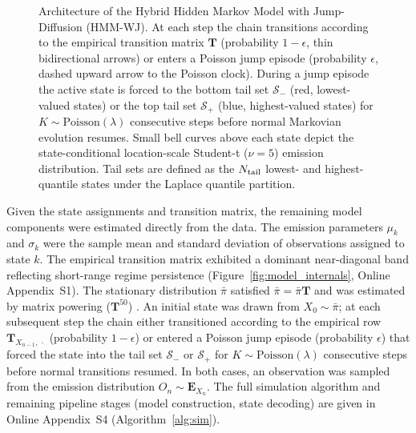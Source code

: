 \begin{figure}[tp]
{\begin{tikzpicture}
\end{tikzpicture}%
}
\caption{Architecture of the Hybrid Hidden Markov Model with Jump-Diffusion (HMM-WJ).
    At each step the chain transitions according to the empirical transition matrix $\mathbf{T}$
    (probability $1-\epsilon$, thin bidirectional arrows) or enters a Poisson jump episode
    (probability $\epsilon$, dashed upward arrow to the Poisson clock).
    During a jump episode the active state is forced to the bottom tail set $\mathcal{S}_{-}$
    (red, lowest-valued states) or the top tail set $\mathcal{S}_{+}$ (blue, highest-valued states)
    for $K\!\sim\!\mathrm{Poisson}(\lambda)$ consecutive steps before normal Markovian evolution
    resumes.  Small bell curves above each state depict the state-conditional
    location-scale Student-t ($\nu=5$) emission distribution.  Tail sets are defined as the
    $N_{\rm tail}$ lowest- and highest-quantile states under the Laplace quantile partition.}
\label{fig:model_architecture}
\end{figure}

Given the state assignments and transition matrix, the remaining model components were estimated directly from the data. The emission parameters $\mu_k$ and $\sigma_k$ were the sample mean and standard deviation of observations assigned to state $k$. The empirical transition matrix exhibited a dominant near-diagonal band reflecting short-range regime persistence (Figure~\ref{fig:model_internals}, Online Appendix~S1). The stationary distribution $\bar{\pi}$ satisfied $\bar{\pi} = \bar{\pi}\mathbf{T}$ and was estimated by matrix powering ($\mathbf{T}^{50}$) \cite{hamilton_regime_2018, grinstead_introduction_1997}. An initial state was drawn from $X_0 \sim \bar{\pi}$; at each subsequent step the chain either transitioned according to the empirical row $\mathbf{T}_{X_{n-1},\,\cdot}$ (probability $1-\epsilon$) or entered a Poisson jump episode (probability $\epsilon$) that forced the state into the tail set $\mathcal{S}_{-}$ or $\mathcal{S}_{+}$ for $K \sim \text{Poisson}(\lambda)$ consecutive steps before normal transitions resumed. In both cases, an observation was sampled from the emission distribution $O_n \sim \mathbf{E}_{X_n}$. The full simulation algorithm and remaining pipeline stages (model construction, state decoding) are given in Online Appendix~S4 (Algorithm~\ref{alg:sim}).


